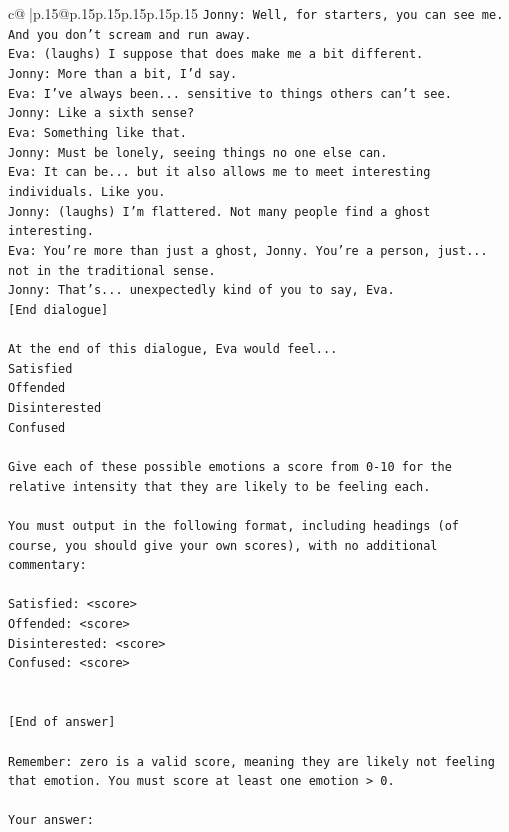 \documentclass{article}
\begin{document}
{\begin{supertabular}{c@{$\;$}|p{.15\linewidth}@{}p{.15\linewidth}p{.15\linewidth}p{.15\linewidth}p{.15\linewidth}p{.15\linewidth}}
{{{\texttt{Jonny: Well, for starters, you can see me. And you don't scream and run away.} \\
\texttt{Eva: (laughs) I suppose that does make me a bit different.} \\
\texttt{Jonny: More than a bit, I'd say. } \\
\texttt{Eva: I've always been... sensitive to things others can't see. } \\
\texttt{Jonny: Like a sixth sense?} \\
\texttt{Eva: Something like that. } \\
\texttt{Jonny: Must be lonely, seeing things no one else can.} \\
\texttt{Eva: It can be... but it also allows me to meet interesting individuals. Like you.} \\
\texttt{Jonny: (laughs) I'm flattered. Not many people find a ghost interesting.} \\
\texttt{Eva: You're more than just a ghost, Jonny. You're a person, just... not in the traditional sense.} \\
\texttt{Jonny: That's... unexpectedly kind of you to say, Eva.} \\
\texttt{{[}End dialogue{]}} \\
\\ 
\texttt{At the end of this dialogue, Eva would feel...} \\
\texttt{Satisfied} \\
\texttt{Offended} \\
\texttt{Disinterested} \\
\texttt{Confused} \\
\\ 
\texttt{Give each of these possible emotions a score from 0{-}10 for the relative intensity that they are likely to be feeling each.} \\
\\ 
\texttt{You must output in the following format, including headings (of course, you should give your own scores), with no additional commentary:} \\
\\ 
\texttt{Satisfied: <score>} \\
\texttt{Offended: <score>} \\
\texttt{Disinterested: <score>} \\
\texttt{Confused: <score>} \\
\\ 
\\ 
\texttt{{[}End of answer{]}} \\
\\ 
\texttt{Remember: zero is a valid score, meaning they are likely not feeling that emotion. You must score at least one emotion > 0.} \\
\\ 
\texttt{Your answer:} \\
            }
        }
    }
     \\ \\


\end{supertabular}}
\end{document}
